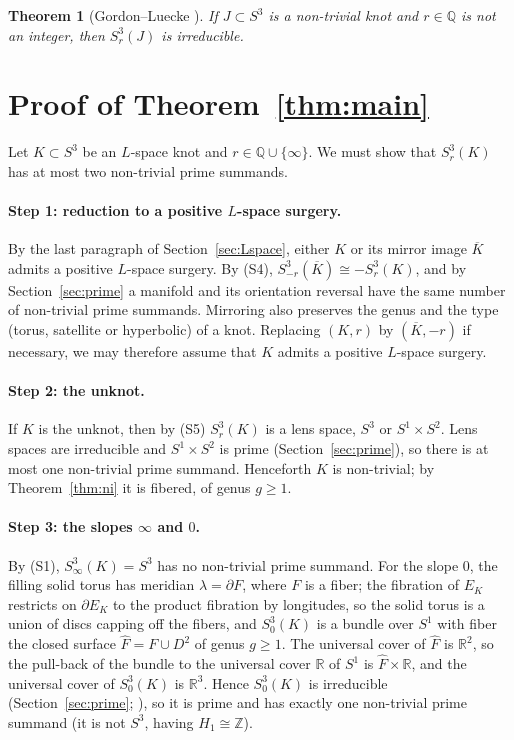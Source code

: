 \documentclass[12pt]{article}
\newcommand{\Z}{\mathbb Z}
\newcommand{\Q}{\mathbb Q}
\newcommand{\R}{\mathbb R}
\newcommand{\Surg}[2]{S^3_{#1}(#2)}
\newtheorem{theorem}{Theorem}[section]
\theoremstyle{definition}
\theoremstyle{remark}
\begin{document}
\begin{theorem}[Gordon--Luecke {\cite{GordonLuecke1987}}]\label{thm:gl}
If \(J\subset S^3\) is a non-trivial knot and \(r\in\Q\) is not an
integer, then \(\Surg{r}{J}\) is irreducible.
\end{theorem}

\section{Proof of Theorem~\ref{thm:main}}\label{sec:proof}

Let \(K\subset S^3\) be an \(L\)-space knot and \(r\in\Q\cup\{\infty\}\).
We must show that \(\Surg{r}{K}\) has at most two non-trivial prime
summands.

\paragraph{Step 1: reduction to a positive \(L\)-space surgery.}
By the last paragraph of Section~\ref{sec:Lspace}, either \(K\) or its
mirror image \(\overline K\) admits a positive \(L\)-space surgery. By (S4),
\(\Surg{-r}{\overline K}\cong-\Surg{r}{K}\), and by
Section~\ref{sec:prime} a manifold and its orientation reversal have the
same number of non-trivial prime summands. Mirroring also preserves the
genus and the type (torus, satellite or hyperbolic) of a knot. Replacing
\((K,r)\) by \((\overline K,-r)\) if necessary, we may therefore assume
that \(K\) admits a positive \(L\)-space surgery.

\paragraph{Step 2: the unknot.}
If \(K\) is the unknot, then by (S5) \(\Surg{r}{K}\) is a lens space,
\(S^3\) or \(S^1\times S^2\). Lens spaces are irreducible and
\(S^1\times S^2\) is prime (Section~\ref{sec:prime}), so there is at most
one non-trivial prime summand. Henceforth \(K\) is non-trivial; by
Theorem~\ref{thm:ni} it is fibered, of genus \(g\geq1\).

\paragraph{Step 3: the slopes \(\infty\) and \(0\).}
By (S1), \(\Surg{\infty}{K}=S^3\) has no non-trivial prime summand. For
the slope \(0\), the filling solid torus has meridian \(\lambda=\partial F\),
where \(F\) is a fiber; the fibration of \(E_K\) restricts on
\(\partial E_K\) to the product fibration by longitudes, so the solid
torus is a union of discs capping off the fibers, and \(\Surg{0}{K}\) is a
bundle over \(S^1\) with fiber the closed surface \(\widehat F=F\cup D^2\)
of genus \(g\geq1\). The universal cover of \(\widehat F\) is \(\R^2\),
so the pull-back of the bundle to the universal cover \(\R\) of \(S^1\)
is \(\widehat F\times\R\), and the universal cover of \(\Surg{0}{K}\) is
\(\R^3\). Hence \(\Surg{0}{K}\) is irreducible (Section~\ref{sec:prime};
\cite[Proposition~1.6]{Hatcher3M}), so it is prime and has exactly one
non-trivial prime summand (it is not \(S^3\), having \(H_1\cong\Z\)).
\end{document}
